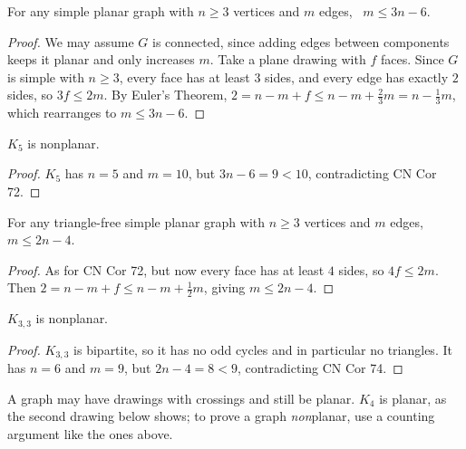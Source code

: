 \begin{corollary}[CN Cor 72]
For any simple planar graph with $n\ge3$ vertices and $m$ edges, \ $m \le 3n-6$.
\end{corollary}
\begin{proof}
We may assume $G$ is connected, since adding edges between components keeps it planar and only increases $m$. Take a plane drawing with $f$ faces. Since $G$ is simple with $n\ge3$, every face has at least $3$ sides, and every edge has exactly $2$ sides, so $3f\le2m$. By Euler's Theorem, $2=n-m+f\le n-m+\frac23m=n-\frac13m$, which rearranges to $m\le3n-6$.
\end{proof}

\begin{corollary}[CN Cor 73]
$K_5$ is nonplanar.
\end{corollary}
\begin{proof}
$K_5$ has $n=5$ and $m=10$, but $3n-6=9<10$, contradicting CN Cor 72.
\end{proof}

\begin{corollary}[CN Cor 74]
For any triangle-free simple planar graph with $n\ge3$ vertices and $m$ edges, \ $m\le2n-4$.
\end{corollary}
\begin{proof}
As for CN Cor 72, but now every face has at least $4$ sides, so $4f\le2m$. Then $2=n-m+f\le n-m+\frac12m$, giving $m\le2n-4$.
\end{proof}

\begin{corollary}[CN Cor 75]
$K_{3,3}$ is nonplanar.
\end{corollary}
\begin{proof}
$K_{3,3}$ is bipartite, so it has no odd cycles and in particular no triangles. It has $n=6$ and $m=9$, but $2n-4=8<9$, contradicting CN Cor 74.
\end{proof}

\begin{note}
A graph may have drawings with crossings and still be planar. $K_4$ is planar, as the second drawing below shows; to prove a graph \emph{non}planar, use a counting argument like the ones above.
\end{note}

